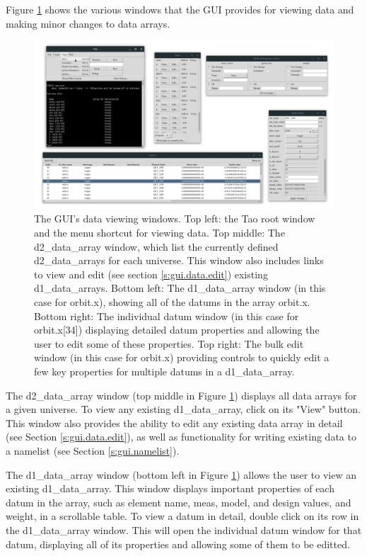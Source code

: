 Figure \ref{fig:gui.data.view} shows the various windows that the GUI provides for viewing data and making minor changes to data arrays.
\begin{figure}
\centering
\includegraphics[width=12cm]{figures/view_data.png}
\caption{The GUI's data viewing windows.
Top left: the Tao root window and the menu shortcut for viewing data.
Top middle: The d2_data_array window, which list the currently defined d2_data_arrays for each universe.
This window also includes links to view and edit (see section \ref{s:gui.data.edit}) existing d1_data_arrays.
Bottom left: The d1_data_array window (in this case for orbit.x), showing all of the datums in the array orbit.x.
Bottom right: The individual datum window (in this case for orbit.x[34]) displaying detailed datum properties and allowing the user to edit some of these properties.
Top right: The bulk edit window (in this case for orbit.x) providing controls to quickly edit a few key properties for multiple datums in a d1_data_array.}
\label{fig:gui.data.view}
\end{figure}

The d2_data_array window (top middle in Figure \ref{fig:gui.data.view}) displays all data arrays for a given universe.
To view any existing d1_data_array, click on its "View" button.
This window also provides the ability to edit any existing data array in detail (see Section \ref{s:gui.data.edit}), as well as functionality for writing existing data to a namelist (see Section \ref{s:gui.namelist}).

The d1_data_array window (bottom left in Figure \ref{fig:gui.data.view}) allows the user to view an existing d1_data_array.
This window displays important properties of each datum in the array, such as element name, meas, model, and design values, and weight, in a scrollable table.
To view a datum in detail, double click on its row in the d1_data_array window.
This will open the individual datum window for that datum, displaying all of its properties and allowing some of them to be editted.

